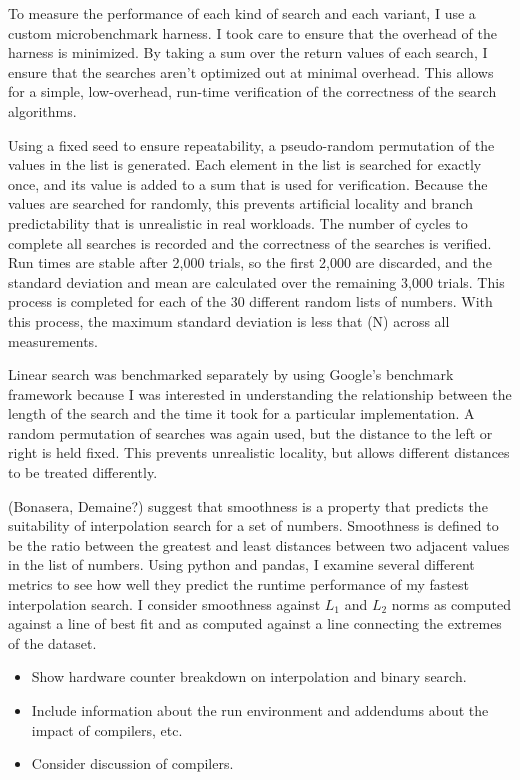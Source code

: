 \documentclass{article}
\begin{document}
To measure the performance of each kind of search and each variant, I use a custom microbenchmark harness. I took care to ensure that the overhead of the harness is minimized. By taking a sum over the return values of each search, I ensure that the searches aren't optimized out at minimal overhead. This allows for a simple, low-overhead, run-time verification of the correctness of the search algorithms.

Using a fixed seed to ensure repeatability, a pseudo-random permutation of the values in the list is generated. Each element in the list is searched for exactly once, and its value is added to a sum that is used for verification. Because the values are searched for randomly, this prevents artificial locality and branch predictability that is unrealistic in real workloads. The number of cycles to complete all searches is recorded and the correctness of the searches is verified. Run times are stable after 2,000 trials, so the first 2,000 are discarded, and the standard deviation and mean are calculated over the remaining 3,000 trials. This process is completed for each of the 30 different random lists of numbers. With this process, the maximum standard deviation is less that (N) across all measurements.

Linear search was benchmarked separately by using Google's benchmark framework because I was interested in understanding the relationship between the length of the search and the time it took for a particular implementation. A random permutation of searches was again used, but the distance to the left or right is held fixed. This prevents unrealistic locality, but allows different distances to be treated differently.

(Bonasera, Demaine?) suggest that smoothness is a property that predicts the suitability of interpolation search for a set of numbers. Smoothness is defined to be the ratio between the greatest and least distances between two adjacent values in the list of numbers. Using python and pandas, I examine several different metrics to see how well they predict the runtime performance of my fastest interpolation search. I consider smoothness against $L_1$ and $L_2$ norms as computed against a line of best fit and as computed against a line connecting the extremes of the dataset.

\begin{itemize}
  \item Show hardware counter breakdown on interpolation and binary search.
  \item Include information about the run environment and addendums about the impact of compilers, etc.
  \item Consider discussion of compilers.
\end{itemize}
\end{document}
